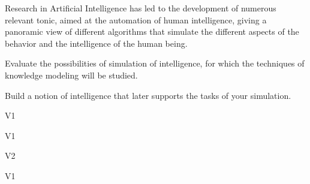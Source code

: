 \begin{syllabus}


\begin{justification}
Research in Artificial Intelligence has led to the development of numerous relevant tonic, aimed at the automation of human intelligence, giving a panoramic view of different
algorithms that simulate the different aspects of the behavior and the intelligence of the human being.
\end{justification}

\begin{goals}
\item Evaluate the possibilities of simulation of intelligence, for which the techniques of knowledge modeling will be studied.
\item Build a notion of intelligence that later supports the tasks of your simulation.
\end{goals}

\begin{outcomes}{V1}
    \item {}
\end{outcomes}

\begin{specificoutcomes}{V1}
    \item {} 
    \item {} 
    \item {} 
    \item {} 
    \item {} 
    \item {} 
    \item {} 
    \item {} 
    \item {} 
\end{specificoutcomes}

\begin{outcomes}{V2}
  \item {}
  \item {}
\end{outcomes}

\begin{competences}{V1}
    \item {} 
    \item {}
    \item {}
\end{competences}


\end{syllabus}
